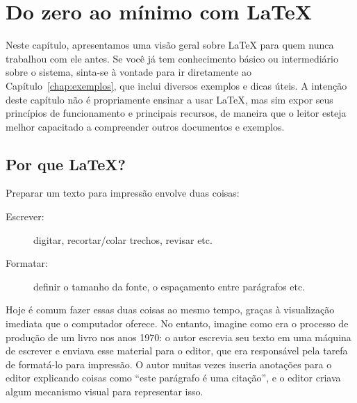 

\newcommand{\sla}{\textbackslash}

\newcommand{\cmd}[1]{\textsf{#1}}

\newcommand{\pkg}[1]{\textsf{#1}}

\newcommand{\ltxcmd}[1]{\cmd{\sla{}#1}}

\chapter{Do zero ao mínimo com \LaTeX{}}
\label{chap:tutorial}

Neste capítulo, apresentamos uma visão geral sobre \LaTeX{} para quem
nunca trabalhou com ele antes. Se você já tem conhecimento básico ou
intermediário sobre o sistema, sinta-se à vontade para ir diretamente ao
Capítulo~\ref{chap:exemplos}, que inclui diversos exemplos e dicas úteis.
A intenção deste capítulo não é propriamente ensinar a usar \LaTeX{},
mas sim expor seus princípios de funcionamento e principais recursos,
de maneira que o leitor esteja melhor capacitado a compreender outros
documentos e exemplos.

\enlargethispage{-.5\baselineskip}

\section{Por que \LaTeX{}?}

Preparar um texto para impressão envolve duas coisas:

\begin{description}
\item[Escrever:] digitar, recortar/colar trechos, revisar etc.
\item[Formatar:] definir o tamanho da fonte, o
espaçamento entre parágrafos etc.
\end{description}

Hoje é comum fazer essas duas coisas ao mesmo tempo, graças à visualização
imediata que o computador oferece. No entanto, imagine como era o processo de
produção de um livro nos anos 1970: o autor escrevia seu texto em uma máquina
de escrever e enviava esse material para o editor, que era responsável pela
tarefa de formatá-lo para impressão. O autor muitas vezes inseria anotações
para o editor explicando coisas como ``este parágrafo é uma citação'', e o
editor criava algum mecanismo visual para representar isso.


